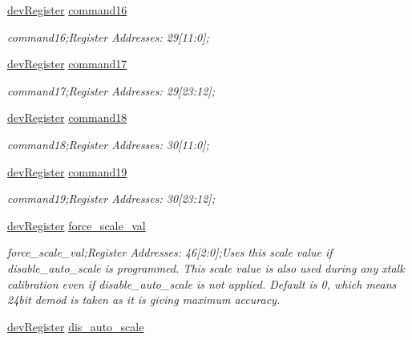\begin{DoxyCompactItemize}
\mbox{\hyperlink{classdev_register}{dev\+Register}} \mbox{\hyperlink{class_o_p_t3101_registers_a0b5bcf7b6eb5131529f3f822883aa8ce}{command16}}
\begin{DoxyCompactList}\small\item\em command16;Register Addresses\+: 29\mbox{[}11\+:0\mbox{]}; \end{DoxyCompactList}\item 
\mbox{\hyperlink{classdev_register}{dev\+Register}} \mbox{\hyperlink{class_o_p_t3101_registers_aafeb04050df7b1f570f73325902351e2}{command17}}
\begin{DoxyCompactList}\small\item\em command17;Register Addresses\+: 29\mbox{[}23\+:12\mbox{]}; \end{DoxyCompactList}\item 
\mbox{\hyperlink{classdev_register}{dev\+Register}} \mbox{\hyperlink{class_o_p_t3101_registers_a2eb8792ca03503a401fb06a819148383}{command18}}
\begin{DoxyCompactList}\small\item\em command18;Register Addresses\+: 30\mbox{[}11\+:0\mbox{]}; \end{DoxyCompactList}\item 
\mbox{\hyperlink{classdev_register}{dev\+Register}} \mbox{\hyperlink{class_o_p_t3101_registers_a53d63b3a25a0aef3934d16c166235d92}{command19}}
\begin{DoxyCompactList}\small\item\em command19;Register Addresses\+: 30\mbox{[}23\+:12\mbox{]}; \end{DoxyCompactList}\item 
\mbox{\hyperlink{classdev_register}{dev\+Register}} \mbox{\hyperlink{class_o_p_t3101_registers_a49bdd79b315c164e81ccd5f0545e76ac}{force\+\_\+scale\+\_\+val}}
\begin{DoxyCompactList}\small\item\em force\+\_\+scale\+\_\+val;Register Addresses\+: 46\mbox{[}2\+:0\mbox{]};Uses this scale value if disable\+\_\+auto\+\_\+scale is programmed. This scale value is also used during any xtalk calibration even if disable\+\_\+auto\+\_\+scale is not applied. Default is \textquotesingle{}0\textquotesingle{}, which means 24bit demod is taken as it is giving maximum accuracy. \end{DoxyCompactList}\item 
\mbox{\hyperlink{classdev_register}{dev\+Register}} \mbox{\hyperlink{class_o_p_t3101_registers_ac4d3309f33897fd7b3750e166f32a934}{dis\+\_\+auto\+\_\+scale}}

\end{DoxyCompactItemize}
